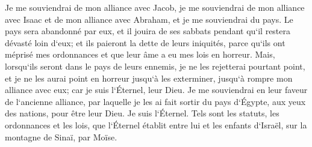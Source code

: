 \verse Je me souviendrai de mon alliance avec Jacob, je me souviendrai de mon alliance avec Isaac et de mon alliance avec Abraham, et je me souviendrai du pays. 
\verse Le pays sera abandonné par eux, et il jouira de ses sabbats pendant qu`il restera dévasté loin d`eux; et ils paieront la dette de leurs iniquités, parce qu`ils ont méprisé mes ordonnances et que leur âme a eu mes lois en horreur. 
\verse Mais, lorsqu`ils seront dans le pays de leurs ennemis, je ne les rejetterai pourtant point, et je ne les aurai point en horreur jusqu`à les exterminer, jusqu`à rompre mon alliance avec eux; car je suis l`Éternel, leur Dieu. 
\verse Je me souviendrai en leur faveur de l`ancienne alliance, par laquelle je les ai fait sortir du pays d`Égypte, aux yeux des nations, pour être leur Dieu. Je suis l`Éternel. 
\verse Tels sont les statuts, les ordonnances et les lois, que l`Éternel établit entre lui et les enfants d`Israël, sur la montagne de Sinaï, par Moïse. 

